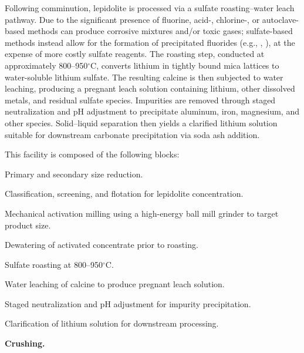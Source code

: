 Following comminution, lepidolite is processed via a sulfate roasting--water leach pathway. Due to the significant presence of fluorine, acid-, chlorine-, or autoclave-based methods can produce corrosive mixtures and/or toxic gases; sulfate-based methods instead allow for the formation of precipitated fluorides (e.g., , ), at the expense of more costly sulfate reagents. The roasting step, conducted at approximately 800--950$^\circ$C, converts lithium in tightly bound mica lattices to water-soluble lithium sulfate. The resulting calcine is then subjected to water leaching, producing a pregnant leach solution containing lithium, other dissolved metals, and residual sulfate species. Impurities are removed through staged neutralization and pH adjustment to precipitate aluminum, iron, magnesium, and other species. Solid--liquid separation then yields a clarified lithium solution suitable for downstream carbonate precipitation via soda ash addition.

This facility is composed of the following blocks:

\begin{description}[noitemsep, topsep=0pt]
    \item[\textbullet\enskip\texttt{Crushing:}] Primary and secondary size reduction.
    \item[\textbullet\enskip\texttt{Classification and Flotation:}] Classification, screening, and flotation for lepidolite concentration.
    \item[\textbullet\enskip\texttt{Grinding:}] Mechanical activation milling using a high-energy ball mill grinder to target product size.
    \item[\textbullet\enskip\texttt{Dewatering:}] Dewatering of activated concentrate prior to roasting.
    \item[\textbullet\enskip\texttt{Sulfate Roasting:}] Sulfate roasting at 800--950$^\circ$C.
    \item[\textbullet\enskip\texttt{Water Leaching:}] Water leaching of calcine to produce pregnant leach solution.
    \item[\textbullet\enskip\texttt{Impurity Removal and Neutralization:}] Staged neutralization and pH adjustment for impurity 
    precipitation.
    \item[\textbullet\enskip\texttt{Clarification:}] Clarification of lithium solution for 
    downstream processing.
\end{description}

\medskip
\noindent\textbf{Crushing.}\quad

